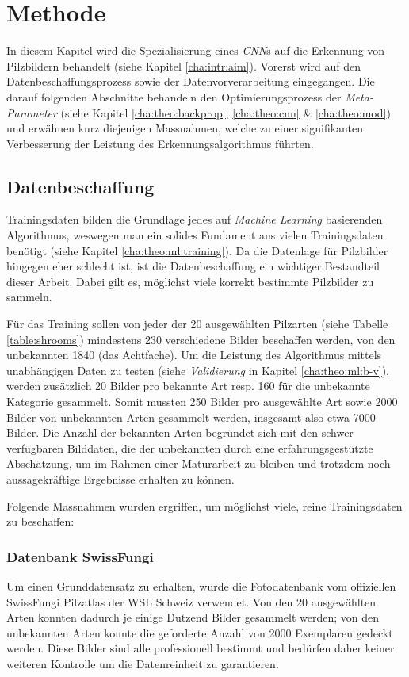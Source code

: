 \section{Methode}\label{cha:method}

In diesem Kapitel wird die Spezialisierung eines \textit{CNN}s auf die Erkennung von Pilzbildern behandelt (siehe Kapitel \ref{cha:intr:aim}). Vorerst wird auf den Datenbeschaffungsprozess sowie der Datenvorverarbeitung eingegangen. Die darauf folgenden Abschnitte behandeln den Optimierungsprozess der \textit{Meta-Parameter} (siehe Kapitel \ref{cha:theo:backprop}, \ref{cha:theo:cnn} \& \ref{cha:theo:mod}) und erwähnen kurz diejenigen Massnahmen, welche zu einer signifikanten Verbesserung der Leistung des Erkennungsalgorithmus führten.

\subsection{Datenbeschaffung} \label{cha:met:datagathering}
Trainingsdaten bilden die Grundlage jedes auf \textit{Machine Learning} basierenden Algorithmus, weswegen man ein solides Fundament aus vielen Trainingsdaten benötigt (siehe Kapitel \ref{cha:theo:ml:training}). Da die Datenlage für Pilzbilder hingegen eher schlecht ist, ist die Datenbeschaffung ein wichtiger Bestandteil dieser Arbeit. Dabei gilt es, möglichst viele korrekt bestimmte Pilzbilder zu sammeln.

Für das Training sollen von jeder der 20 ausgewählten Pilzarten (siehe Tabelle \ref{table:shrooms}) mindestens 230 verschiedene Bilder beschaffen werden, von den unbekannten 1840 (das Achtfache). Um die Leistung des Algorithmus mittels unabhängigen Daten zu testen (siehe \textit{Validierung} in Kapitel \ref{cha:theo:ml:b-v}), werden zusätzlich 20 Bilder pro bekannte Art resp. 160 für die unbekannte Kategorie gesammelt. Somit mussten 250 Bilder pro ausgewählte Art sowie 2000 Bilder von unbekannten Arten gesammelt werden, insgesamt also etwa 7000 Bilder. Die Anzahl der bekannten Arten begründet sich mit den schwer verfügbaren Bilddaten, die der unbekannten durch eine erfahrungsgestützte Abschätzung, um im Rahmen einer Maturarbeit zu bleiben und trotzdem noch aussagekräftige Ergebnisse erhalten zu können.

Folgende Massnahmen wurden ergriffen, um möglichst viele, reine Trainingsdaten zu beschaffen:

\subsubsection{Datenbank SwissFungi}
Um einen Grunddatensatz zu erhalten, wurde die Fotodatenbank vom offiziellen SwissFungi Pilzatlas der WSL Schweiz verwendet\cite{wsl}. Von den 20 ausgewählten Arten konnten dadurch je einige Dutzend Bilder gesammelt werden; von den unbekannten Arten konnte die geforderte Anzahl von 2000 Exemplaren gedeckt werden. Diese Bilder sind alle professionell bestimmt und bedürfen daher keiner weiteren Kontrolle um die Datenreinheit zu garantieren. 

